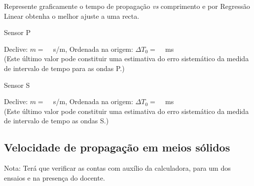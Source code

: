 \documentclass[a4paper,12pt]{article}  %
\begin{document}
Represente graficamente o tempo de propagação \emph{vs} comprimento e por Regressão Linear obtenha o melhor ajuste a uma recta.

Sensor P

Declive: $m=$ ~\underline{\makebox[2cm][r]{~}} s/m, Ordenada na origem: $\Delta T_0=$ ~\underline{\makebox[2cm][r]{~}} ms\\
(Este último valor pode constituir uma estimativa do erro sistemático da medida de intervalo de tempo para as ondas P.)

Sensor S

Declive: $m=$ ~\underline{\makebox[2cm][r]{~}} s/m, Ordenada na origem: $\Delta T_0=$ ~\underline{\makebox[2cm][r]{~}} ms\\
(Este último valor pode constituir uma estimativa do erro sistemático da medida de intervalo de tempo as ondas S.)


\subsection{\sf Velocidade de propagação em meios sólidos}%

Nota: Terá que verificar as contas com auxílio da calculadora, para um dos ensaios e na presença do docente.


\end{document}
